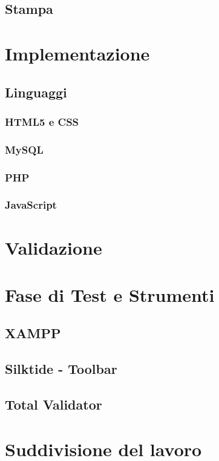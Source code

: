\documentclass[a4paper, dvipsnames, table]{article}
\begin{document}
	\subsection{Stampa}

\newpage
\section{Implementazione}%
	\subsection{Linguaggi}
		\subsubsection{HTML5 e CSS}
			
		\subsubsection{MySQL}
			
		\subsubsection{PHP}
			
		\subsubsection{JavaScript}
			

\newpage
\section{Validazione}%
	

\newpage
\section{Fase di Test e Strumenti}%
	\subsection{XAMPP}
		
	\subsection{Silktide - Toolbar}
		
	\subsection{Total Validator}
		
	
\newpage
\section{Suddivisione del lavoro}
	
\end{document}
